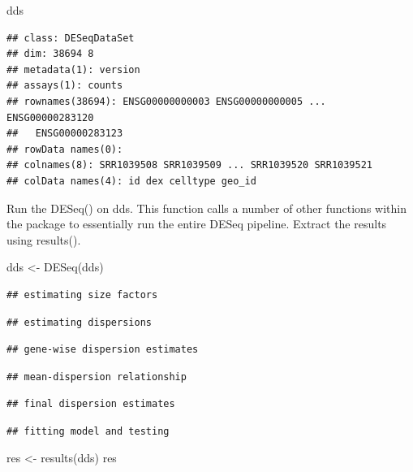\documentclass[
]{article}
\newenvironment{Shaded}{\begin{snugshade}}{\end{snugshade}}
\newcommand{\FunctionTok}[1]{\textcolor[rgb]{0.00,0.00,0.00}{#1}}
\newcommand{\NormalTok}[1]{#1}
\newcommand{\OtherTok}[1]{\textcolor[rgb]{0.56,0.35,0.01}{#1}}
\begin{document}
\begin{Shaded}
\begin{Highlighting}[]
\NormalTok{dds}
\end{Highlighting}
\end{Shaded}

\begin{verbatim}
## class: DESeqDataSet 
## dim: 38694 8 
## metadata(1): version
## assays(1): counts
## rownames(38694): ENSG00000000003 ENSG00000000005 ... ENSG00000283120
##   ENSG00000283123
## rowData names(0):
## colnames(8): SRR1039508 SRR1039509 ... SRR1039520 SRR1039521
## colData names(4): id dex celltype geo_id
\end{verbatim}

Run the DESeq() on dds. This function calls a number of other functions
within the package to essentially run the entire DESeq pipeline. Extract
the results using results().

\begin{Shaded}
\begin{Highlighting}[]
\NormalTok{dds }\OtherTok{\textless{}{-}} \FunctionTok{DESeq}\NormalTok{(dds)}
\end{Highlighting}
\end{Shaded}

\begin{verbatim}
## estimating size factors
\end{verbatim}

\begin{verbatim}
## estimating dispersions
\end{verbatim}

\begin{verbatim}
## gene-wise dispersion estimates
\end{verbatim}

\begin{verbatim}
## mean-dispersion relationship
\end{verbatim}

\begin{verbatim}
## final dispersion estimates
\end{verbatim}

\begin{verbatim}
## fitting model and testing
\end{verbatim}

\begin{Shaded}
\begin{Highlighting}[]
\NormalTok{res }\OtherTok{\textless{}{-}} \FunctionTok{results}\NormalTok{(dds)}
\NormalTok{res}
\end{Highlighting}
\end{Shaded}
\end{document}
